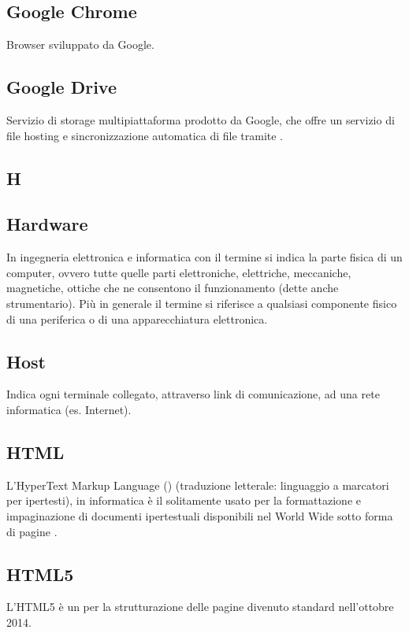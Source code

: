 \subsection{Google Chrome}
Browser  sviluppato da Google.

\subsection{Google Drive}
Servizio di  storage multipiattaforma prodotto da Google, che offre un servizio di file hosting e
sincronizzazione automatica di file tramite .

\newpage

\begin{center}
\Huge\section{\uppercase{H}}
\end{center}

\subsection{Hardware}
In ingegneria elettronica e informatica con il termine  si indica la parte fisica
di un computer, ovvero tutte quelle parti elettroniche, elettriche, meccaniche, magnetiche,
ottiche che ne consentono il funzionamento (dette anche strumentario). Più in generale il
termine si riferisce a qualsiasi componente fisico di una periferica o di una apparecchiatura
elettronica.

\subsection{Host}
Indica ogni terminale collegato, attraverso link di comunicazione, ad una rete informatica (es. Internet).

\subsection{HTML}
L'HyperText Markup Language () (traduzione letterale: linguaggio a marcatori per ipertesti), in informatica è il  solitamente usato per la formattazione e impaginazione di documenti ipertestuali disponibili nel World Wide  sotto forma di pagine .

\subsection{HTML5}
L’HTML5 è un  per la strutturazione delle pagine  divenuto
standard  nell’ottobre 2014.

